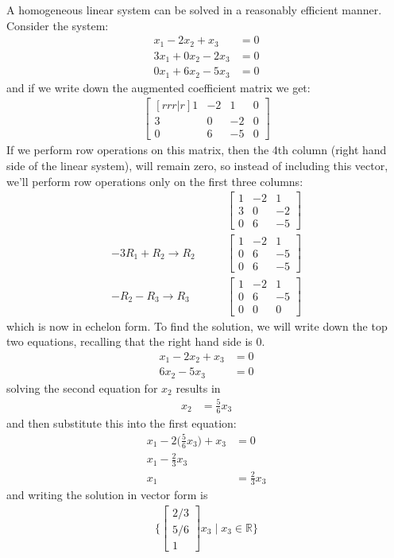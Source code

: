 A homogeneous linear system can be solved in a reasonably efficient manner.  Consider the system:
%
\begin{align*}
x_1 -2x_2 + x_3 & = 0 \\
3x_1 + 0x_2 -2x_3 & = 0 \\
0x_1 + 6x_2 -5x_3 & = 0
\end{align*}
and if we write down the augmented coefficient matrix we get:
%
\begin{align*}
\begin{bmatrix}[rrr|r]
1 & -2 & 1 & 0 \\
3 & 0 & -2 & 0 \\
0 & 6 & -5 & 0 
\end{bmatrix}
\end{align*}
If we perform row operations on this matrix, then the 4th column (right hand side of the linear system), will remain zero, so instead of including this vector, we'll perform row operations only on the first three columns:
%
\begin{align*}
&\begin{bmatrix}
1 & -2 & 1 \\
3 & 0 & -2 \\
0 & 6 & -5
\end{bmatrix}\\
-3 R_1 + R_2 \rightarrow R_2 \qquad & 
\begin{bmatrix}
1 & -2 & 1 \\
0 & 6 & -5 \\
0 & 6 & -5 
\end{bmatrix} \\
-R_2 -R_3 \rightarrow R_3 \qquad & 
\begin{bmatrix}
1 & -2 & 1 \\
0 & 6 & -5 \\
0 & 0 & 0 
\end{bmatrix} 
\end{align*}
which is now in echelon form.  To find the solution, we will write down the top two equations, recalling that the right hand side is 0. 
%
\begin{align*}
x_1 -2x_2+x_3 & = 0 \\
6x_2-5x_3 & = 0
\end{align*}
solving the second equation for $x_2$ results in 
%
\begin{align*}
x_2 & = \frac{5}{6} x_3 
\end{align*}
and then substitute this into the first equation:
%
\begin{align*}
x_1 - 2\biggl(\frac{5}{6} x_3 \biggr) + x_3 & = 0 \\
x_1 -\frac{2}{3} x_3 \\
x_1 & = \frac{2}{3} x_3
\end{align*}
and writing the solution in vector form is
%
\begin{align*}
\{ \begin{bmatrix}
2/3 \\ 5/6 \\ 1 
\end{bmatrix} x_3 \; | \; x_3 \in \mathbb{R} \}
\end{align*}




